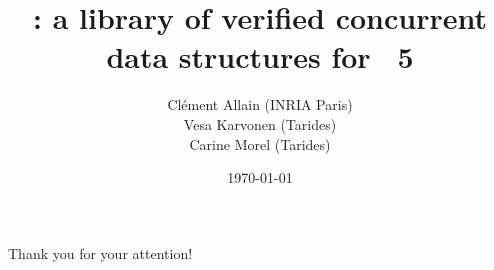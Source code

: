 \documentclass[xcolor=x11names]{beamer}
\title{\Saturn: a library of verified concurrent data structures for \OCaml~5}
\date{\today}
\author{
  Clément Allain (INRIA Paris) \\
  Vesa Karvonen (Tarides) \\
  Carine Morel (Tarides)
}
\begin{document}
\maketitle

% 





\begin{frame}
\LARGE
\centering
Thank you for your attention!
\end{frame}

\appendix

\end{document}
